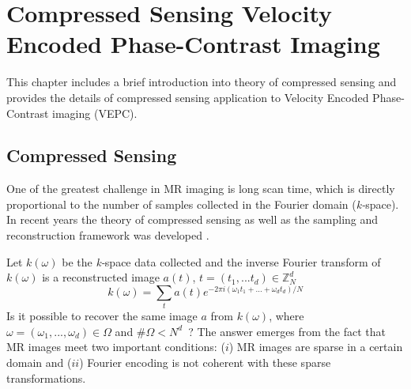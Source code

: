 \chapter{Compressed Sensing Velocity Encoded Phase-Contrast Imaging}
This chapter includes a brief introduction into theory of compressed sensing and provides the details of compressed sensing application to Velocity Encoded Phase-Contrast imaging (VEPC).
\section{Compressed Sensing}
One of the greatest challenge in MR imaging is long scan time, which is directly proportional to the number of samples collected in the Fourier domain (\textit{k-}space).
In recent years the theory of compressed sensing as well as the sampling and reconstruction framework was developed \cite{Donoho:2006cia, 2008ISPM...25...21C, Lustig:2007cua}.

Let $k(\omega)$ be the \mbox{\textit{k-}space} data collected and the inverse Fourier transform of $k(\omega)$ is a reconstructed image $a(t)$, $t = (t_1, ... t_d) \in \mathbb{Z}^d_N$
\begin{equation}
	k(\omega) = \sum_t{a(t)e^{-2\pi i (\omega_1 t_1 + ... + \omega_d t_d)/N}}
\end{equation}
Is it possible to recover the same image $a$ from $k(\omega)$, where $\omega = (\omega_1, ..., \omega_d) \in \Omega$ and $\#\Omega < N^d$~? The answer emerges from the fact that MR images meet two important conditions: ($i$) MR images are sparse in a certain domain and ($ii$) Fourier encoding is not coherent with these sparse transformations. 
